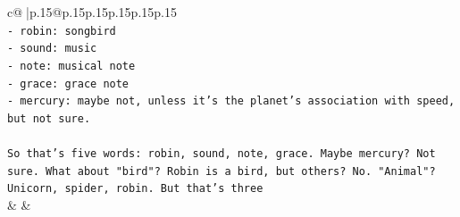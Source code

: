 \documentclass{article}
\begin{document}
{\begin{supertabular}{c@{$\;$}|p{.15\linewidth}@{}p{.15\linewidth}p{.15\linewidth}p{.15\linewidth}p{.15\linewidth}p{.15\linewidth}}
{{{\\ 
\texttt{{-} robin: songbird} \\
\texttt{{-} sound: music} \\
\texttt{{-} note: musical note} \\
\texttt{{-} grace: grace note} \\
\texttt{{-} mercury: maybe not, unless it's the planet's association with speed, but not sure.} \\
\\ 
\texttt{So that's five words: robin, sound, note, grace. Maybe mercury? Not sure. What about "bird"? Robin is a bird, but others? No. "Animal"? Unicorn, spider, robin. But that's three} \\
            }
        }
    }
    & & \\ \\


\end{supertabular}}
\end{document}
